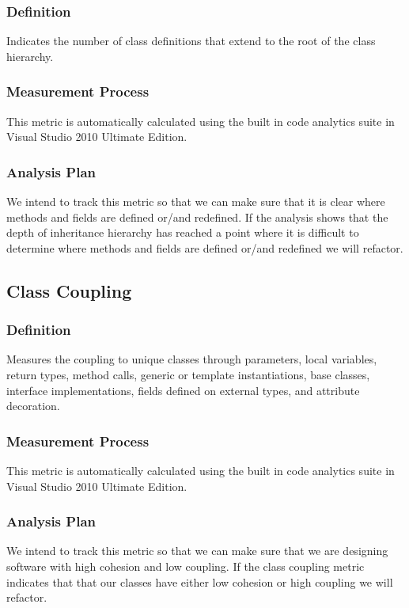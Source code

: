 \documentclass[12pt]{article}
\begin{document}
\subsubsection{Definition}
 Indicates the number of class definitions that extend to the root of the class hierarchy. 

\subsubsection{Measurement Process}
This metric is automatically calculated using the built in code analytics suite in Visual Studio 2010 Ultimate Edition.

\subsubsection{Analysis Plan}
We intend to track this metric so that we can make sure that it is clear where methods and fields are defined or/and redefined. If the analysis shows that the depth of inheritance hierarchy has reached a point where it is difficult to determine where methods and fields are defined or/and redefined we will refactor.

\subsection{Class Coupling}
\subsubsection{Definition}
Measures the coupling to unique classes through parameters, local variables, return types, method calls, generic or template instantiations, base classes, interface implementations, fields defined on external types, and attribute decoration. 

\subsubsection{Measurement Process}
This metric is automatically calculated using the built in code analytics suite in Visual Studio 2010 Ultimate Edition.

\subsubsection{Analysis Plan}
We intend to track this metric so that we can make sure that we are designing software with high cohesion and low coupling.  If the class coupling metric indicates that that our classes have either low cohesion or high coupling we will refactor.
\end{document}

